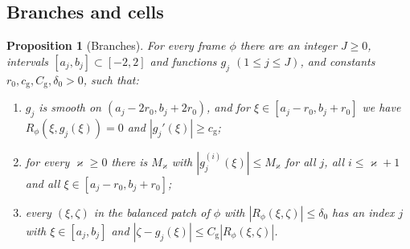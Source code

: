 \documentclass[11pt,reqno]{amsart}
\newtheorem{proposition}[theorem]{Proposition}
\theoremstyle{definition}
\theoremstyle{remark}
\numberwithin{equation}{section}
\begin{document}
\subsection{Branches and cells}
\begin{proposition}[Branches]\label{prop:branches}
For every frame $\phi$ there are an integer $J\ge0$, intervals
$[a_j,b_j]\subset[-2,2]$ and functions $g_j$ $(1\le j\le J)$, and constants
$r_0,c_{\mathrm g},C_{\mathrm g},\delta_0>0$, such that:
\begin{enumerate}[label=\textup{(\roman*)}]
\item $g_j$ is smooth on $(a_j-2r_0,b_j+2r_0)$, and for
$\xi\in[a_j-r_0,b_j+r_0]$ we have $R_\phi(\xi,g_j(\xi))=0$ and
$|g_j'(\xi)|\ge c_{\mathrm g}$;
\item for every $\varkappa\ge0$ there is $M_\varkappa$ with
$|g_j^{(i)}(\xi)|\le M_\varkappa$ for all $j$, all $i\le \varkappa+1$ and all
$\xi\in[a_j-r_0,b_j+r_0]$;
\item every $(\xi,\zeta)$ in the balanced patch of $\phi$ with
$|R_\phi(\xi,\zeta)|\le\delta_0$ has an index $j$ with $\xi\in[a_j,b_j]$ and
$|\zeta-g_j(\xi)|\le C_{\mathrm g}|R_\phi(\xi,\zeta)|$.
\end{enumerate}
\end{proposition}
\end{document}
